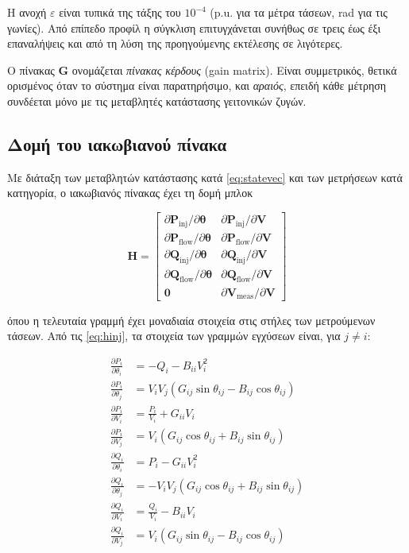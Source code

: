 Η ανοχή $\varepsilon$ είναι τυπικά της τάξης του $10^{-4}$ (p.u. για τα μέτρα τάσεων, rad για
τις γωνίες). Από επίπεδο προφίλ η σύγκλιση επιτυγχάνεται συνήθως σε τρεις έως έξι επαναλήψεις
και από τη λύση της προηγούμενης εκτέλεσης σε λιγότερες.

Ο πίνακας $\mathbf{G}$ ονομάζεται \emph{πίνακας κέρδους} (gain matrix). Είναι συμμετρικός,
θετικά ορισμένος όταν το σύστημα είναι παρατηρήσιμο, και \emph{αραιός}, επειδή κάθε μέτρηση
συνδέεται μόνο με τις μεταβλητές κατάστασης γειτονικών ζυγών.

\subsection{Δομή του ιακωβιανού πίνακα}

Με διάταξη των μεταβλητών κατάστασης κατά \eqref{eq:statevec} και των μετρήσεων κατά
κατηγορία, ο ιακωβιανός πίνακας έχει τη δομή μπλοκ

\begin{equation}
\mathbf{H} =
\begin{bmatrix}
\partial \mathbf{P}_{\mathrm{inj}} / \partial \boldsymbol{\theta} & \partial \mathbf{P}_{\mathrm{inj}} / \partial \mathbf{V} \\
\partial \mathbf{P}_{\mathrm{flow}} / \partial \boldsymbol{\theta} & \partial \mathbf{P}_{\mathrm{flow}} / \partial \mathbf{V} \\
\partial \mathbf{Q}_{\mathrm{inj}} / \partial \boldsymbol{\theta} & \partial \mathbf{Q}_{\mathrm{inj}} / \partial \mathbf{V} \\
\partial \mathbf{Q}_{\mathrm{flow}} / \partial \boldsymbol{\theta} & \partial \mathbf{Q}_{\mathrm{flow}} / \partial \mathbf{V} \\
\mathbf{0} & \partial \mathbf{V}_{\mathrm{meas}} / \partial \mathbf{V}
\end{bmatrix}
\label{eq:jacblocks}
\end{equation}

όπου η τελευταία γραμμή έχει μοναδιαία στοιχεία στις στήλες των μετρούμενων τάσεων. Από τις
\eqref{eq:hinj}, τα στοιχεία των γραμμών εγχύσεων είναι, για $j \neq i$:

\begin{align}
\frac{\partial P_i}{\partial \theta_i} &= -Q_i - B_{ii} V_i^2 \\
\frac{\partial P_i}{\partial \theta_j} &= V_i V_j \left( G_{ij}\sin\theta_{ij} - B_{ij}\cos\theta_{ij} \right) \\
\frac{\partial P_i}{\partial V_i} &= \frac{P_i}{V_i} + G_{ii} V_i \\
\frac{\partial P_i}{\partial V_j} &= V_i \left( G_{ij}\cos\theta_{ij} + B_{ij}\sin\theta_{ij} \right) \\
\frac{\partial Q_i}{\partial \theta_i} &= P_i - G_{ii} V_i^2 \\
\frac{\partial Q_i}{\partial \theta_j} &= -V_i V_j \left( G_{ij}\cos\theta_{ij} + B_{ij}\sin\theta_{ij} \right) \\
\frac{\partial Q_i}{\partial V_i} &= \frac{Q_i}{V_i} - B_{ii} V_i \\
\frac{\partial Q_i}{\partial V_j} &= V_i \left( G_{ij}\sin\theta_{ij} - B_{ij}\cos\theta_{ij} \right)
\label{eq:jacinj}
\end{align}

